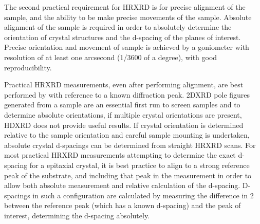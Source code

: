 The second practical requirement for HRXRD is for precise alignment of the sample, and the ability to be make precise movements of the sample.
Absolute alignment of the sample is required in order to absolutely determine the orientation of crystal structures and the d-spacing of the planes of interest.
Precise orientation and movement of sample is achieved by a goniometer with resolution of at least one arcsecond (1/3600 of a degree), with good reproducibility.

Practical HRXRD measurements, even after performing alignment, are best performed by with reference to a known diffraction peak.
2DXRD pole figures generated from a sample are an essential first run to screen samples and to determine absolute orientations, if multiple crystal orientations are present, HDXRD does not provide useful results.
If crystal orientation is determined relative to the sample orientation and careful sample mounting is undertaken, absolute crystal d-spacings can be determined from straight HRXRD scans.
For most practical HRXRD measurements attempting to determine the exact d-spacing for a epitaxial crystal, it is best practice to align to a strong reference peak of the substrate, and including that peak in the measurement in order to allow both absolute measurement and relative calculation of the d-spacing.
D-spacings in such a configuration are calculated by measuring the difference in 2\straighttheta{} between the reference peak (which has a known d-spacing) and the peak of interest, determining the d-spacing absolutely.

